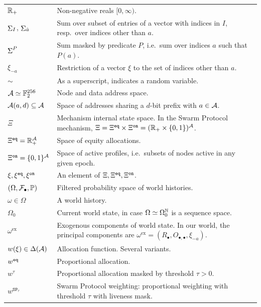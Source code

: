 \renewcommand{\arraystretch}{1.3}
\begin{tabularx}{\textwidth}{lX}

  $\mathbb{R}_+$ & Non-negative reals $[0,\infty)$. \\
  $\mathop{\Sigma}_I$, $\mathop{\Sigma}_{\hat{a}}$     & Sum over subset of entries of a vector with indices in $I$, resp.~over indices other than $a$. \\
  $\mathop{\Sigma}^P$   & Sum masked by predicate $P$, i.e.~sum over indices $a$ such that $P(a)$. \\
  $\xi_{-a}$ & Restriction of a vector $\xi$ to the set of indices other than $a$. \\
  $\sim$ & As a superscript, indicates a random variable. \\
  $\mathcal{A}\simeq\mathbb{F}_2^{256}$ & Node and data address space. \\
  $\mathcal{A}(a,d)\subseteq\mathcal{A}$ & Space of addresses sharing a $d$-bit prefix with $a\in\mathcal{A}$. \\
  $\Xi$& Mechanism internal state space.   
  In the Swarm Protocol mechanism, $\Xi=\Xi^{\mathtt{eq}}\times\Xi^{\mathtt{on}}=(\mathbb{R}_+\times\{0,1\})^{\mathcal{A}}$. \\
  $\Xi^{\mathtt{eq}}=\mathbb{R}_+^{\mathcal{A}}$ & Space of equity allocations. \\
  $\Xi^{\mathtt{on}} = \{0,1\}^{\mathcal{A}}$ & Space of active profiles, i.e.~subsets of nodes active in any given epoch. \\
  $\xi,\xi^{\mathtt{eq}},\xi^{\mathtt{on}}$ & An element of $\Xi,\Xi^{\mathtt{eq}},\Xi^{\mathtt{on}}$. \\
  $(\Omega,\mathcal{F}_\bullet,\mathbb{P})$ & Filtered probability space of world histories. \\
  $\omega\in\Omega$ & A world history. \\
  $\Omega_0$ & Current world state, in case $\Omega\simeq \Omega_0^{\mathbb{N}}$ is a sequence space. \\
  $\omega^\mathrm{ex}$ & Exogenous components of world state. In our world, the principal components are $\omega^\mathrm{ex}=(R_\bullet,O_{\bullet,\bullet},\xi_{-a})$. \\
  $w(\xi)\in\Delta(\mathcal{A})$ & Allocation function. Several variants. \\
  $w^{\mathtt{eq}}$   & Proportional allocation. \\
  $w^\tau$ & Proportional allocation masked by threshold $\tau>0$. \\
  $w^{\mathtt{SP}_\tau}$  & Swarm Protocol weighting: proportional weighting with threshold $\tau$ with liveness mask. \\

\end{tabularx}
